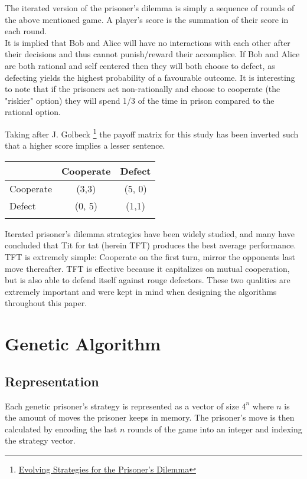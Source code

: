 \documentclass[12pt]{article}
\begin{document}
The iterated version of the prisoner's dilemma is simply a sequence of rounds of
the above mentioned game.  A player's score is the summation of their score in
each round. \\

It is implied that Bob and Alice will have no interactions with each other after
their decisions and thus cannot punish/reward their accomplice. If Bob and Alice are
both rational and self centered then they will both choose to defect, as defecting
yields the highest probability of a favourable outcome.  It is interesting to note
that if the prisoners act non-rationally and choose to cooperate
(the "riskier" option) they will spend 1/3 of the time in prison compared
to the rational option. \\

\pagebreak

Taking after J. Golbeck
\footnote{\href{http://cgis.cs.umd.edu/~golbeck/downloads/JGolbeck\_prison.pdf}
{Evolving Strategies for the Prisoner's Dilemma}}
the payoff matrix for this study has been
inverted such that a higher score implies a lesser sentence. \\

\begin{center}
    \begin{tabular}{l | c | c}
         & Cooperate & Defect \\
        \hline
        Cooperate & (3,3) & (5, 0)\\
        \hline
        Defect & (0, 5) & (1,1) \\ \\
    \end{tabular}
\end{center}

Iterated prisoner's dilemma strategies have been widely studied, and many have
concluded that Tit for tat (herein TFT) produces the best average performance.
TFT is extremely simple: Cooperate on the first turn, mirror the opponents
last move thereafter.  TFT is effective because it capitalizes on mutual
cooperation, but is also able to defend itself against rouge defectors.  These
two qualities are extremely important and were kept in mind when designing the
algorithms throughout this paper.
\clearpage
\pagebreak

\section{Genetic Algorithm}

\subsection{Representation}
Each genetic prisoner's strategy is represented as a vector of size
$4^n$ where $n$ is the amount of moves the prisoner keeps in memory.  The
prisoner's move is then calculated by encoding the last $n$ rounds of the game
into an integer and indexing the strategy vector.
\end{document}
